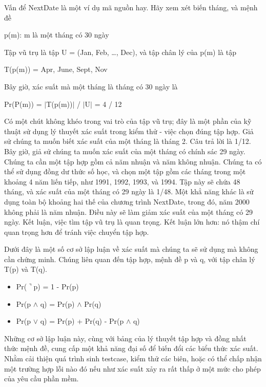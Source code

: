 \documentclass[11pt,a4paper,oneside]{article}
\begin{document}
Vấn để NextDate là một ví dụ mã nguồn hay. Hãy xem xét biến tháng, và mệnh đề 
\begin{center}
p(m): m là một tháng có 30 ngày
\end{center}

Tập vũ trụ là tập U = (Jan, Feb, …, Dec), và tập chân lý của p(m) là tập
\begin{center}
T(p(m)) = {Apr, June, Sept, Nov}
\end{center}

Bây giờ, xác suất mà một tháng là tháng có 30 ngày là 
\begin{center}
Pr(P(m)) = $\mid$T(p(m))$\mid$ / $\mid$U$\mid$ = 4 / 12
\end{center}

Có một chút không khéo trong vai trò của tập vũ trụ; đây là một phần của kỹ thuật sử dụng lý thuyết xác suất trong kiểm thử - việc chọn đúng tập hợp. Giả sử chúng ta muốn biết xác suất của một tháng là tháng 2. Câu trả lời là 1/12. Bây giờ, giả sử chúng ta muốn xác suất của một tháng có chính sác 29 ngày. Chúng ta cần một tập hợp gồm cả năm nhuận và năm không nhuận. Chúng ta có thể sử dụng đồng dư thức số học, và chọn một tập gồm các tháng trong một khoảng 4 năm liến tiếp, như 1991, 1992, 1993, và 1994. Tập này sẽ chứa 48 tháng, và xác suất của một tháng có 29 ngày là 1/48. Một khẳ năng khác là sử dụng toàn bộ khoảng hai thế của chương trình NextDate, trong đó, năm 2000 không phải là năm nhuận. Điều này sẽ làm giảm xác suất của một tháng có 29 ngày. Kết luận, việc tìm tập vũ trụ là quan trọng. Kết luận lớn hơn: nó thậm chí quan trọng hơn để tránh việc chuyển tập hợp.

Dưới đây là một số cơ sở lập luận về xác suất mà chúng ta sẽ sử dụng mà không cần chứng minh. Chúng liên quan đến tập hợp, mệnh đề p và q, với tập chân lý T(p) và T(q).
\begin{itemize}
\item Pr($\urcorner$p) = 1 - Pr(p)
\item Pr(p $\wedge$ q) = Pr(p) $\wedge$ Pr(q)
\item Pr(p $\vee$ q) = Pr(p) + Pr(q) - Pr(p $\wedge$ q)
\end{itemize}

Những cơ sở lập luận này, cùng với bảng của lý thuyết tập hợp và đồng nhất thức
mệnh đề, cung cấp một khả năng đại số để biến đổi các biểu thức xác suất. Nhằm
cải thiện quá trình sinh testcase, kiểm thử các biên, hoặc có thể chấp nhận một
trường hợp lỗi nào đó nếu như xác suất xảy ra rất thấp ở một mức cho phép của
yêu cầu phần mềm.
\end{document}
